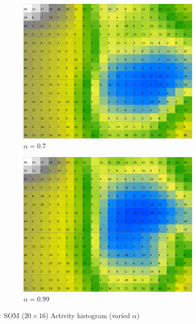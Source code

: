 \documentclass{acm_proc_article-sp}
\begin{document}
\begin{figure}
\begin{subfigure}[b]{0.24\linewidth}
    \end{subfigure}
    \begin{subfigure}[b]{0.24\linewidth}
        \includegraphics[width=\linewidth]{img/wine-20x16-activity-histogram-alpha-0,7}
        \caption{$\alpha=0.7$}
        \label{fig:wine-20x16-activity-histogram-alpha-0,7}
    \end{subfigure}
    \begin{subfigure}[b]{0.24\linewidth}
        \includegraphics[width=\linewidth]{img/wine-20x16-activity-histogram-alpha-0,99}
        \caption{$\alpha=0.99$}
        \label{fig:wine-20x16-activity-histogram-alpha-0,99}
    \end{subfigure}
    \caption{SOM ($20\times16$) Activity histogram (varied $\alpha$)}
    \label{fig:wine-20x16-activity-histogram-alpha}
\end{figure}
\end{document}
